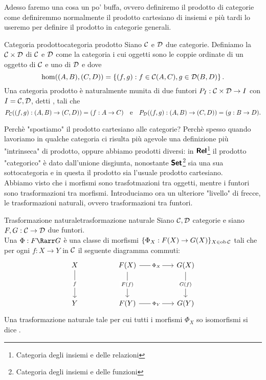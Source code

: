 \documentclass{article}
\renewcommand\C{\mc{C}}
\newcommand\D{\mc{D}}
\begin{document}
Adesso faremo una cosa un po' buffa, ovvero definiremo il prodotto di categorie come definiremmo normalmente il prodotto cartesiano di insiemi e più tardi lo useremo per definire il prodotto in categorie generali.

\begin{definition}{Categoria prodotto}{categoria prodotto}
    Siano $\C$ e $\D$ due categorie. Definiamo la  $\C\times\D$ di $\C$ e $\D$ come la categoria i cui oggetti sono le coppie ordinate di un oggetto di $\C$ e uno di $\D$ e dove
    \[ \hom((A,B),(C,D)) = \left\{ (f,g) : f \in \C(A,C), g \in \D(B,D) \right\}. \]
    Una categoria prodotto è naturalmente munita di due funtori $P_I : \C\times\D\to I$ con $I = \C,\D$, detti , tali che
    \[ P_\C ((f,g):(A,B)\to(C,D)) = (f:A\to C) \quad\text{e}\quad P_\D ((f,g):(A,B)\to(C,D)) = (g:B\to D). \]
\end{definition}

Perchè "spostiamo" il prodotto cartesiano alle categorie? Perchè spesso quando lavoriamo in qualche categoria ci risulta più agevole una definizione più "intrinseca" di prodotto, oppure abbiamo prodotti diversi: in $\text{\sffamily\textbf{Rel}}$\footnote{Categoria degli insiemi e delle relazioni} il prodotto "categorico" è dato dall'unione disgiunta, nonostante $\text{\sffamily\textbf{Set}}$\footnote{Categoria degli insiemi e delle funzioni} sia una sua sottocategoria e in questa il prodotto sia l'usuale prodotto cartesiano.\\
Abbiamo visto che i morfismi sono trasfotmazioni tra oggetti, mentre i funtori sono trasformazioni tra morfismi. Introduciamo ora un ulteriore "livello" di frecce, le trasformazioni naturali, ovvero trasformazioni tra funtori.

\begin{definition}{Trasformazione naturale}{trasformazione naturale}
    Siano $\C,\D$ categorie e siano $F,G : \C\to\D $ due funtori.\\
    Una  $\Phi:F\Rarr G$ è una classe di morfismi $\{\Phi_X : F(X)\to G(X)\}_{X\in\ob\C}$ tali che per ogni $f:X\to Y$ in $\C$ il seguente diagramma commuti:
    \[\begin{tikzcd}
    	X && {F(X)} && {G(X)} \\
    	\\
    	Y && {F(Y)} && {G(Y)}
    	\arrow["f"{description}, from=1-1, to=3-1]
    	\arrow["{\Phi_X}"{description}, from=1-3, to=1-5]
    	\arrow["{F(f)}"{description}, from=1-3, to=3-3]
    	\arrow["{G(f)}"{description}, from=1-5, to=3-5]
	    \arrow["{\Phi_Y}"{description}, from=3-3, to=3-5]
    \end{tikzcd}\]
    Una trasformazione naturale tale per cui tutti i morfismi $\Phi_X$ so isomorfismi si dice .
\end{definition}
\end{document}
